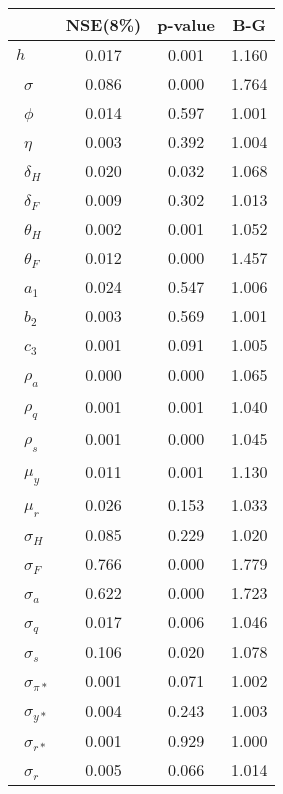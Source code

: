 \begin{tiny}\begin{tabular}{lccc}
\hline
&\textbf{NSE(8\%)}&\textbf{p-value}&\textbf{B-G}\\\hline
\textbf{$ h             $}&0.017&0.001&1.160\\\
\textbf{$ \sigma        $}&0.086&0.000&1.764\\\
\textbf{$ \phi          $}&0.014&0.597&1.001\\\
\textbf{$ \eta          $}&0.003&0.392&1.004\\\
\textbf{$ \delta_{H}    $}&0.020&0.032&1.068\\\
\textbf{$ \delta_{F}    $}&0.009&0.302&1.013\\\
\textbf{$ \theta_{H}    $}&0.002&0.001&1.052\\\
\textbf{$ \theta_{F}    $}&0.012&0.000&1.457\\\
\textbf{$ a_{1}         $}&0.024&0.547&1.006\\\
\textbf{$ b_{2}         $}&0.003&0.569&1.001\\\
\textbf{$ c_{3}         $}&0.001&0.091&1.005\\\
\textbf{$ \rho_{a}      $}&0.000&0.000&1.065\\\
\textbf{$ \rho_{q}      $}&0.001&0.001&1.040\\\
\textbf{$ \rho_{s}      $}&0.001&0.000&1.045\\\
\textbf{$ \mu_{y}       $}&0.011&0.001&1.130\\\
\textbf{$ \mu_{r}       $}&0.026&0.153&1.033\\\
\textbf{$ \sigma_{H}    $}&0.085&0.229&1.020\\\
\textbf{$ \sigma_{F}    $}&0.766&0.000&1.779\\\
\textbf{$ \sigma_{a}    $}&0.622&0.000&1.723\\\
\textbf{$ \sigma_{q}    $}&0.017&0.006&1.046\\\
\textbf{$ \sigma_{s}    $}&0.106&0.020&1.078\\\
\textbf{$ \sigma_{\pi*} $}&0.001&0.071&1.002\\\
\textbf{$ \sigma_{y*}   $}&0.004&0.243&1.003\\\
\textbf{$ \sigma_{r*}   $}&0.001&0.929&1.000\\\
\textbf{$ \sigma_{r}    $}&0.005&0.066&1.014\\\hline
\end{tabular}
\end{tiny}